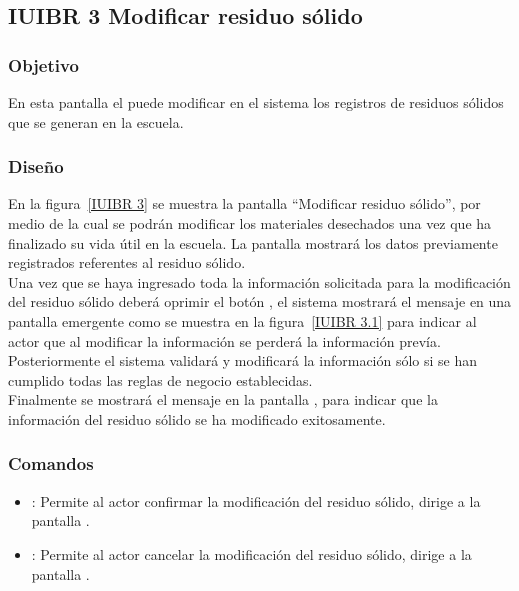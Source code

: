 \subsection{IUIBR 3 Modificar residuo sólido}

\subsubsection{Objetivo}

      En esta pantalla el  puede modificar en el sistema los registros de residuos sólidos que se generan en la escuela.

\subsubsection{Diseño}

    En la figura~\ref{IUIBR 3} se muestra la pantalla ``Modificar residuo sólido'', por medio de la cual se podrán modificar los materiales desechados una vez que ha finalizado su vida útil en la escuela. La pantalla mostrará los datos previamente registrados referentes al residuo sólido.\\
        
    Una vez que se haya ingresado toda la información solicitada para la modificación del residuo sólido deberá oprimir el botón , el sistema mostrará el mensaje  en una pantalla emergente como se muestra en la figura~\ref{IUIBR 3.1} para indicar al actor que al modificar la información se perderá la información prevía. Posteriormente el sistema validará y modificará la información sólo si se han cumplido todas las reglas de negocio establecidas.\\
    
    Finalmente se mostrará el mensaje  en la pantalla , para indicar que la información del residuo sólido se ha modificado exitosamente.
      


\subsubsection{Comandos}
    \begin{itemize}
	\item {}: Permite al actor confirmar la modificación del residuo sólido, dirige a la pantalla .
	\item {}: Permite al actor cancelar la modificación del residuo sólido, dirige a la pantalla .
    \end{itemize}


